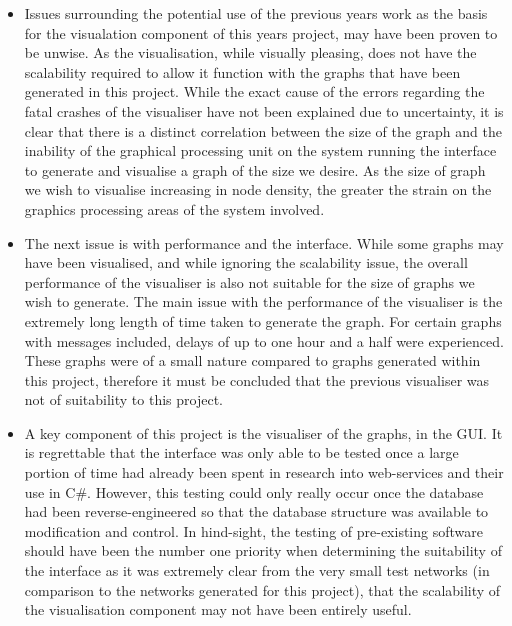 \begin{itemize}

\item Issues surrounding the potential use of the previous years work as the basis for the visualation component of this years project, may have been proven to be unwise. As the visualisation, while visually pleasing, does not have the scalability required to allow it function with the graphs that have been generated in this project. While the exact cause of the errors regarding the fatal crashes of the visualiser have not been explained due to uncertainty, it is clear that there is a distinct correlation between the size of the graph and the inability of the graphical processing unit on the system running the interface to generate and visualise a graph of the size we desire. As the size of graph we wish to visualise increasing in node density, the greater the strain on the graphics processing areas of the system involved. 

\item The next issue is with performance and the interface. While some graphs may have been visualised, and while ignoring the scalability issue, the overall performance of the visualiser is also not suitable for the size of graphs we wish to generate. The main issue with the performance of the visualiser is the extremely long length of time taken to generate the graph. For certain graphs with messages included, delays of up to one hour and a half were experienced. These graphs were of a small nature compared to graphs generated within this project, therefore it must be concluded that the previous visualiser was not of suitability to this project.

\item A key component of this project is the visualiser of the graphs, in the GUI. It is regrettable that the interface was only able to be tested once a large portion of time had already been spent in research into web-services and their use in C\#. However, this testing could only really occur once the database had been reverse-engineered so that the database structure was available to modification and control. In hind-sight, the testing of pre-existing software should have been the number one priority when determining the suitability of the interface as it was extremely clear from the very small test networks (in comparison to the networks generated for this project), that the scalability of the visualisation component may not have been entirely useful.
\end{itemize}

